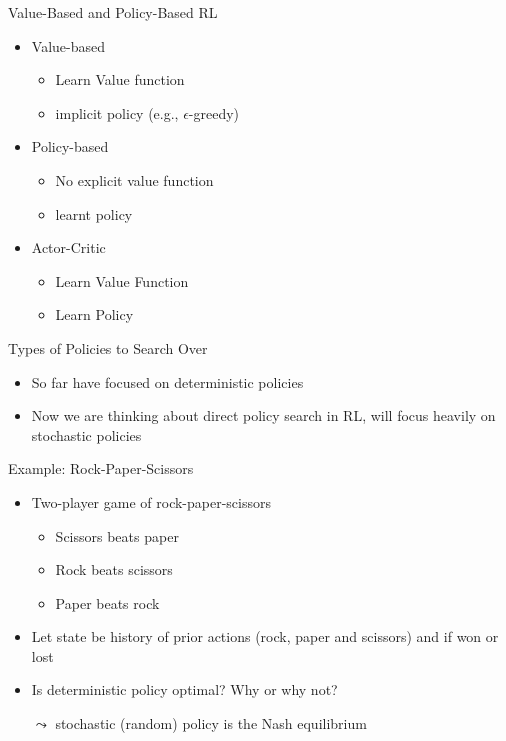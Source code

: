 \begin{frame}[c]{Value-Based and Policy-Based RL}

	\begin{itemize}
		\item Value-based
		\begin{itemize}
			\item Learn Value function
			\item implicit policy (e.g., $\epsilon$-greedy)
		\end{itemize}
		\item Policy-based
		\begin{itemize}
			\item No explicit value function
			\item learnt policy
		\end{itemize}
		\item Actor-Critic
		\begin{itemize}
			\item Learn Value Function
			\item Learn Policy
		\end{itemize}
		
	\end{itemize}		
	
\end{frame}
\begin{frame}[c]{Types of Policies to Search Over}
	
\begin{itemize}
	\item So far have focused on deterministic policies
	\item Now we are thinking about direct policy search in RL, will focus
	heavily on stochastic policies
\end{itemize}

\end{frame}
\begin{frame}[c]{Example: Rock-Paper-Scissors}
	
	\begin{itemize}
		\item Two-player game of rock-paper-scissors
		\begin{itemize}
			\item Scissors beats paper
			\item Rock beats scissors
			\item Paper beats rock
		\end{itemize}
		\item Let state be history of prior actions (rock, paper and scissors) and if
		won or lost
		\item Is deterministic policy optimal? Why or why not?
		\pause
		\item[$\leadsto$] stochastic (random) policy is the Nash equilibrium
	\end{itemize}

	
\end{frame}
